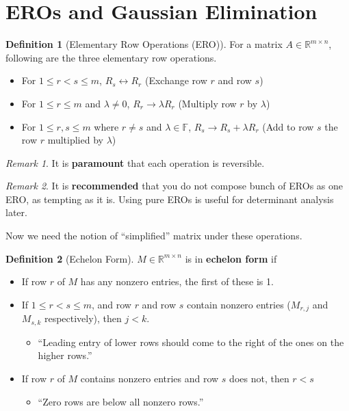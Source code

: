 \documentclass[12pt, a4paper]{article}
\newcommand{\R}{\mathbb{R}}
\theoremstyle{remark}
\newtheorem{remark}{Remark}
\theoremstyle{definition}
\newtheorem{definition}{Definition}
\numberwithin{equation}{section}
\numberwithin{definition}{section}
\numberwithin{example}{section}
\numberwithin{exercise}{section}
\numberwithin{remark}{section}
\numberwithin{figure}{section}
\begin{document}
\section{EROs and Gaussian Elimination}
\begin{definition}[Elementary Row Operations (ERO)]
    For a matrix $A \in \R^{m \times n}$, following are the three elementary row operations.
    \begin{itemize}
        \item For $1 \leq r < s \leq m$, $R_s \leftrightarrow R_r$ (Exchange row $r$ and row $s$)
        \item For $1 \leq r \leq m$ and $\lambda \neq 0$, $R_r \rightarrow \lambda R_r$ (Multiply row $r$ by $\lambda$)
        \item For $1 \leq r, s \leq m$ where $r \neq s$ and $\lambda \in \mathbb{F}$, $R_s \rightarrow R_s + \lambda R_r$ (Add to row $s$ the row $r$ multiplied by $\lambda$)
    \end{itemize}
\end{definition}
\begin{remark}
    It is \textbf{paramount} that each operation is reversible.
\end{remark}
\begin{remark}
    It is \textbf{recommended} that you do not compose bunch of EROs as one ERO, as tempting as it is.
    Using pure EROs is useful for determinant analysis later.
\end{remark}
Now we need the notion of ``simplified'' matrix under these operations.
\begin{definition}[Echelon Form]
    $M \in \R^{m \times n}$ is in \textbf{echelon form} if
    \begin{itemize}
        \item If row $r$ of $M$ has any nonzero entries, the first of these is 1.
        \item If $1 \leq r < s \leq m$, and row $r$ and row $s$ contain nonzero entries ($M_{r,j}$ and $M_{s, k}$ respectively), then $j < k$.
            \begin{itemize}
                \item ``Leading entry of lower rows should come to the right of the ones on the higher rows.''
            \end{itemize}
        \item If row $r$ of $M$ contains nonzero entries and row $s$ does not, then $r < s$
            \begin{itemize}
                \item ``Zero rows are below all nonzero rows.''
            \end{itemize}
    \end{itemize}
\end{definition}
\end{document}

